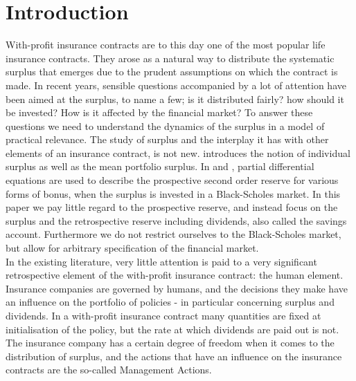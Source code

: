 \documentclass[12pt]{article}
\theoremstyle{my_thm}
\begin{document}
\section{Introduction}
With-profit insurance contracts are to this day one of the most popular life insurance contracts. They arose as a natural way to distribute the systematic surplus that emerges due to the prudent assumptions on which the contract is made. In recent years, sensible questions accompanied by a lot of attention have been aimed at the surplus, to name a few; is it distributed fairly? how should it be invested? How is it affected by the financial market? To answer these questions we need to understand the dynamics of the surplus in a model of practical relevance. The study of surplus and the interplay it has with other elements of an insurance contract, is not new. \citet{NorbergB} introduces the notion of individual surplus as well as the mean portfolio surplus. In \citet{Steffensen0} and \citet{Steffensen1}, partial differential equations are used to describe the prospective second order reserve for various forms of bonus, when the surplus is invested in a Black-Scholes market. In this paper we pay little regard to the prospective reserve, and instead focus on the surplus and the retrospective reserve including dividends, also called the savings account. Furthermore we do not restrict ourselves to the Black-Scholes market, but allow for arbitrary specification of the financial market.
\\[12pt]
In the existing literature, very little attention is paid to a very significant retrospective element of the with-profit insurance contract: the human element. Insurance companies are governed by humans, and the decisions they make have an influence on the portfolio of policies - in particular concerning surplus and dividends. In a with-profit insurance contract many quantities are fixed at initialisation of the policy, but the rate at which dividends are paid out is not. The insurance company has a certain degree of freedom when it comes to the distribution of surplus, and the actions that have an influence on the insurance contracts are the so-called Management Actions.
\end{document}
